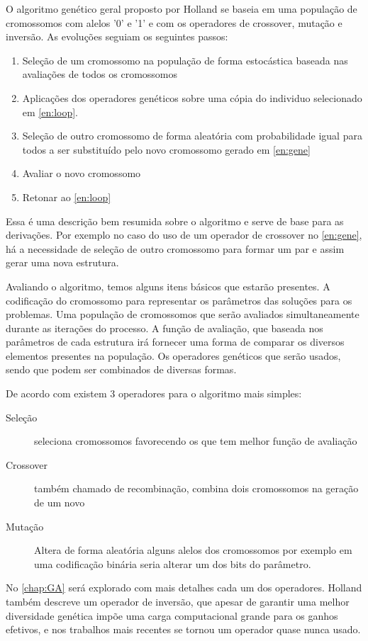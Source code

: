 O algoritmo genético geral proposto por Holland se baseia em uma população de cromossomos com alelos '0' e '1' e com os operadores de crossover, mutação e inversão. As evoluções seguiam os seguintes passos: 
\begin{enumerate}
	\item \label{en:loop} Seleção de um cromossomo na população de forma estocástica baseada nas avaliações de todos os cromossomos
	\item \label{en:gene} Aplicações dos operadores genéticos sobre uma cópia do individuo selecionado em \ref{en:loop}.
	\item Seleção de outro cromossomo de forma aleatória com probabilidade igual para todos a ser substituído pelo novo cromossomo gerado em \ref{en:gene}
	\item Avaliar o novo cromossomo
	\item Retonar ao \ref{en:loop}
\end{enumerate}

Essa é uma descrição bem resumida sobre o algoritmo e serve de base para as derivações. Por exemplo no caso do uso de um operador de crossover no \autoref{en:gene}, há a necessidade de seleção de outro cromossomo para formar um par e assim gerar uma nova estrutura.

Avaliando o algoritmo, temos alguns itens básicos que estarão presentes. A codificação do cromossomo para representar os parâmetros das soluções para os problemas. Uma população de cromossomos que serão avaliados simultaneamente durante as iterações do processo. A função de avaliação, que baseada nos parâmetros de cada estrutura irá fornecer uma forma de comparar os diversos elementos presentes na população. Os operadores genéticos que serão usados, sendo que podem ser combinados de diversas formas. 

De acordo com \citeauthor{Mitchell1996} existem 3 operadores para o algoritmo mais simples:
\begin{description}
	\item[Seleção] seleciona cromossomos favorecendo os que tem melhor função de avaliação
	\item[Crossover] também chamado de recombinação, combina dois cromossomos na geração de um novo
	\item[Mutação] Altera de forma aleatória alguns alelos dos cromossomos por exemplo em uma codificação binária seria alterar um dos bits do parâmetro.
\end{description}

No \autoref{chap:GA} será explorado com mais detalhes cada um dos operadores. Holland também descreve um operador de inversão, que apesar de garantir uma melhor diversidade genética impõe uma carga computacional grande para os ganhos efetivos, e nos trabalhos mais recentes se tornou um operador quase nunca usado.

